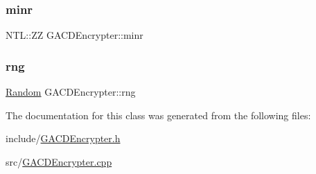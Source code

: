 \subsubsection{\texorpdfstring{minr}{minr}}
{\footnotesize\ttfamily N\+T\+L\+::\+ZZ G\+A\+C\+D\+Encrypter\+::minr\hspace{0.3cm}{\ttfamily [private]}}

\mbox{\label{classGACDEncrypter_a3f8959f045b15262ae7d680b35d0815c}} 
\subsubsection{\texorpdfstring{rng}{rng}}
{\footnotesize\ttfamily \hyperlink{classRandom}{Random} G\+A\+C\+D\+Encrypter\+::rng\hspace{0.3cm}{\ttfamily [private]}}



The documentation for this class was generated from the following files\+:\begin{DoxyCompactItemize}
\item 
include/\hyperlink{GACDEncrypter_8h}{G\+A\+C\+D\+Encrypter.\+h}\item 
src/\hyperlink{GACDEncrypter_8cpp}{G\+A\+C\+D\+Encrypter.\+cpp}\end{DoxyCompactItemize}
